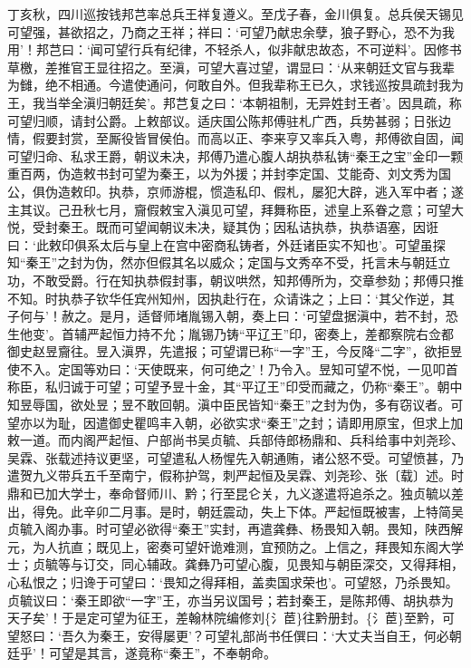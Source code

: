 \documentclass[]{article}
\begin{document}
丁亥秋，四川巡按钱邦芑率总兵王祥复遵义。至戊子春，金川俱复。总兵侯天锡见可望强，甚欲招之，乃商之王祥；祥曰：`可望乃献忠余孽，狼子野心，恐不为我用'！邦芑曰：`闻可望行兵有纪律，不轻杀人，似非献忠故态，不可逆料'。因修书草檄，差推官王显往招之。至滇，可望大喜过望，谓显曰：`从来朝廷文官与我辈为雠，绝不相通。今遣使通问，何敢自外。但我辈称王已久，求钱巡按具疏封我为王，我当举全滇归朝廷矣'。邦芑复之曰：`本朝祖制，无异姓封王者'。因具疏，称可望归顺，请封公爵。上敕部议。适庆国公陈邦傅驻札广西，兵势甚弱；日张边情，假要封赏，至厮役皆冒侯伯。而高以正、李来亨又率兵入粤，邦傅欲自固，闻可望归命、私求王爵，朝议未决，邦傅乃遣心腹人胡执恭私铸``秦王之宝''金印一颗重百两，伪造敕书封可望为秦王，以为外援；并封李定国、艾能奇、刘文秀为国公，俱伪造敕印。执恭，京师游棍，惯造私印、假札，屡犯大辟，逃入军中者；遂主其议。己丑秋七月，齎假敕宝入滇见可望，拜舞称臣，述皇上系眷之意；可望大悦，受封秦王。既而可望闻朝议未决，疑其伪；因私诘执恭，执恭语塞，因诳曰：`此敕印俱系太后与皇上在宫中密商私铸者，外廷诸臣实不知也'。可望虽探知``秦王''之封为伪，然亦但假其名以威众；定国与文秀卒不受，托言未与朝廷立功，不敢受爵。行在知执恭假封事，朝议哄然，知邦傅所为，交章参劾；邦傅只推不知。时执恭子钦华任宾州知州，因执赴行在，众请诛之；上曰：`其父作逆，其子何与'！赦之。是月，适督师堵胤锡入朝，奏上曰：`可望盘据滇中，若不封，恐生他变'。首辅严起恒力持不允；胤锡乃铸``平辽王''印，密奏上，差都察院右佥都御史赵昱齎往。昱入滇界，先遣报；可望谓已称``一字''王，今反降``二字''，欲拒昱使不入。定国等劝曰：`天使既来，何可绝之'！乃令入。昱知可望不悦，一见叩首称臣，私归诚于可望；可望予昱十金，其``平辽王''印受而藏之，仍称``秦王''。朝中知昱辱国，欲处昱；昱不敢回朝。滇中臣民皆知``秦王''之封为伪，多有窃议者。可望亦以为耻，因遣御史瞿鸣丰入朝，必欲实求``秦王''之封；请即用原宝，但求上加敕一道。而内阁严起恒、户部尚书吴贞毓、兵部侍郎杨鼎和、兵科给事中刘尧珍、吴霖、张载述持议更坚，可望遣私人杨惺先入朝通贿，诸公怒不受。可望愤甚，乃遣贺九义带兵五千至南宁，假称护驾，刺严起恒及吴霖、刘尧珍、张〔载〕述。时鼎和已加大学士，奉命督师川、黔；行至昆仑关，九义遂遣将追杀之。独贞毓以差出，得免。此辛卯二月事。是时，朝廷震动，失上下体。严起恒既被害，上特简吴贞毓入阁办事。时可望必欲得``秦王''实封，再遣龚彝、杨畏知入朝。畏知，陕西解元，为人抗直；既见上，密奏可望奸诡难测，宜预防之。上信之，拜畏知东阁大学士；贞毓等与订交，同心辅政。龚彝乃可望心腹，见畏知与朝臣深交，又得拜相，心私恨之；归谗于可望曰：`畏知之得拜相，盖卖国求荣也'。可望怒，乃杀畏知。贞毓议曰：`秦王即欲``一字''王，亦当另议国号；若封秦王，是陈邦傅、胡执恭为天子矣'！于是定可望为征王，差翰林院编修刘\{氵茞\}往黔册封。\{氵茞\}至黔，可望怒曰：`吾久为秦王，安得屡更'？可望礼部尚书任僎曰：`大丈夫当自王，何必朝廷乎'！可望是其言，遂竟称``秦王''，不奉朝命。
\end{document}
